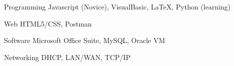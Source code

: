 


\begin{cvskills}


\cvskill
{Programming} %
{Javascript (Novice), VisualBasic, LaTeX, Python (learning)} %


\cvskill
{Web} %
{HTML5/CSS, Postman} %


\cvskill
{Software} %
{Microsoft Office Suite, MySQL, Oracle VM} %


\cvskill
{Networking} %
{DHCP, LAN/WAN, TCP/IP} %


\end{cvskills}